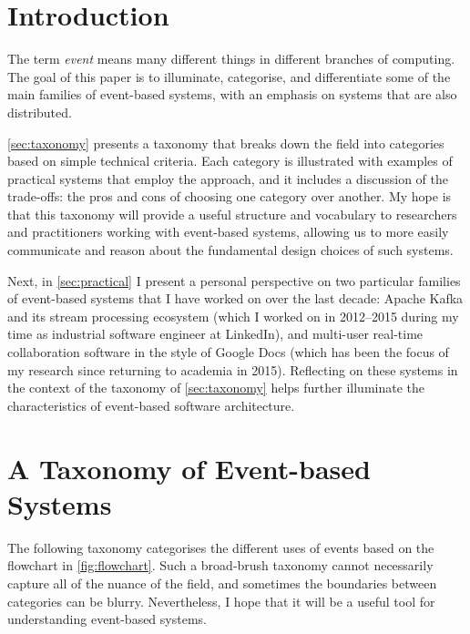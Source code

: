 \documentclass[sigconf]{acmart}
\begin{document}
\maketitle

\def\figureautorefname{Figure}
\def\sectionautorefname{Section}
\def\subsectionautorefname{Section}
\def\subsubsectionautorefname{Section}

\section{Introduction}

The term \emph{event} means many different things in different branches of computing.
The goal of this paper is to illuminate, categorise, and differentiate some of the main families of event-based systems, with an emphasis on systems that are also distributed.

\autoref{sec:taxonomy} presents a taxonomy that breaks down the field into categories based on simple technical criteria.
Each category is illustrated with examples of practical systems that employ the approach, and it includes a discussion of the trade-offs: the pros and cons of choosing one category over another.
My hope is that this taxonomy will provide a useful structure and vocabulary to researchers and practitioners working with event-based systems, allowing us to more easily communicate and reason about the fundamental design choices of such systems.

Next, in \autoref{sec:practical} I present a personal perspective on two particular families of event-based systems that I have worked on over the last decade: Apache Kafka and its stream processing ecosystem (which I worked on in 2012--2015 during my time as industrial software engineer at LinkedIn), and multi-user real-time collaboration software in the style of Google Docs (which has been the focus of my research since returning to academia in 2015).
Reflecting on these systems in the context of the taxonomy of \autoref{sec:taxonomy} helps further illuminate the characteristics of event-based software architecture.


\section{A Taxonomy of Event-based Systems}\label{sec:taxonomy}

The following taxonomy categorises the different uses of events based on the flowchart in \autoref{fig:flowchart}.
Such a broad-brush taxonomy cannot necessarily capture all of the nuance of the field, and sometimes the boundaries between categories can be blurry.
Nevertheless, I hope that it will be a useful tool for understanding event-based systems.
\end{document}

